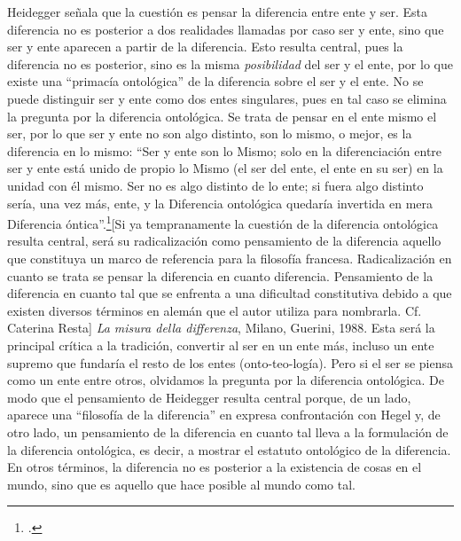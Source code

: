 \documentclass{book}
\begin{document}
Heidegger señala que la cuestión es pensar la diferencia entre ente y
ser. Esta diferencia no es posterior a dos realidades llamadas por caso
ser y ente, sino que ser y ente aparecen a partir de la diferencia. Esto
resulta central, pues la diferencia no es posterior, sino es la misma
\emph{posibilidad} del ser y el ente, por lo que existe una \enquote{primacía
ontológica} de la diferencia sobre el ser y el ente. No se puede
distinguir ser y ente como dos entes singulares, pues en tal caso se
elimina la pregunta por la diferencia ontológica. Se trata de pensar en
el ente mismo el ser, por lo que ser y ente no son algo distinto, son lo
mismo, o mejor, es la diferencia en lo mismo: \enquote{Ser y ente son lo Mismo;
solo en la diferenciación entre ser y ente está unido de propio lo Mismo
(el ser del ente, el ente en su ser) en la unidad con él mismo. Ser no
es algo distinto de lo ente; si fuera algo distinto sería, una vez más,
ente, y la Diferencia ontológica quedaría invertida en mera Diferencia
óntica}.\footcites[176]{poggeler1993}[Si ya tempranamente la
  cuestión de la diferencia ontológica resulta central, será su
  radicalización como pensamiento de la diferencia aquello que
  constituya un marco de referencia para la filosofía francesa.
  Radicalización en cuanto se trata se pensar la diferencia en cuanto
  diferencia. Pensamiento de la diferencia en cuanto tal que se enfrenta
  a una dificultad constitutiva debido a que existen diversos términos
  en alemán que el autor utiliza para nombrarla. Cf. Caterina Resta]
  {\emph{La misura della differenza}, Milano, Guerini, 1988.} Esta será
la principal crítica a la tradición, convertir al ser en un ente más,
incluso un ente supremo que fundaría el resto de los entes
(onto-teo-logía). Pero si el ser se piensa como un ente entre otros,
olvidamos la pregunta por la diferencia ontológica. De modo que el
pensamiento de Heidegger resulta central porque, de un lado, aparece una
\enquote{filosofía de la diferencia} en expresa confrontación con Hegel y, de
otro lado, un pensamiento de la diferencia en cuanto tal lleva a la
formulación de la diferencia ontológica, es decir, a mostrar el estatuto
ontológico de la diferencia. En otros términos, la diferencia no es
posterior a la existencia de cosas en el mundo, sino que es aquello que
hace posible al mundo como tal.
\end{document}
